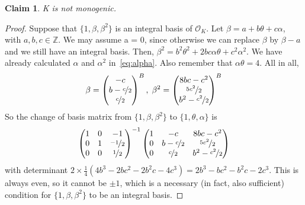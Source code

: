 \documentclass[11pt]{article}
\newtheorem{claim}[theorem]{Claim}
\theoremstyle{definition}
\begin{document}
    \begin{claim}
        K is not monogenic.
    \end{claim}
    \begin{proof}
        Suppose that $\{1, \beta, \beta^2\}$ is an integral basis of $\mathcal{O}_K$.
        Let $\beta=a+b\theta+c\alpha$, with $a,b,c \in \mathbb{Z}$.
        We may assume a = 0, since otherwise we can replace $\beta$ by $\beta - a$
        and we still have an integral basis.
        Then, $\beta^2 = b^2\theta^2+2bc\alpha\theta+c^2\alpha^2$.
        We have already calculated $\alpha$ and $\alpha^2$ in~\eqref{eq:alpha}.
        Also remember that $\alpha\theta=4$.
        All in all,
        \[
            \beta = \begin{pmatrix}
                -c \\
                b-\nicefrac{c}{2} \\
                \nicefrac{c}{2}
            \end{pmatrix}^B,\;
            \beta^2 = \begin{pmatrix}
                8bc-c^2 \\
                \nicefrac{5c^2}{2} \\
                b^2 - \nicefrac{c^2}{2}
            \end{pmatrix}^B
        \]
        So the change of basis matrix from $\{1, \beta, \beta^2\}$ to $\{1, \theta, \alpha\}$  is
        \[
            \begin{pmatrix}
                1 & 0 & -1 \\
                0 & 1 & \nicefrac{-1}{2} \\
                0 & 0 & \nicefrac{1}{2}
            \end{pmatrix}^{-1}
            \begin{pmatrix}
                1 & -c& 8bc-c^2 \\
                0 & b-\nicefrac{c}{2} & \nicefrac{5c^2}{2} \\
                0 & \nicefrac{c}{2} & b^2 - \nicefrac{c^2}{2}
            \end{pmatrix}

        \]
        with determinant $2 \times \frac{1}{4} (4b^3- 2bc^2 - 2b^2c -4c^3)
        = 2b^3-bc^2-b^2c-2c^3$.
        This is always even, so it cannot be $\pm 1$,
        which is a necessary (in fact, also sufficient) condition for $\{1, \beta, \beta^2\}$ to be an integral basis.
    \end{proof}
    
\end{document}
